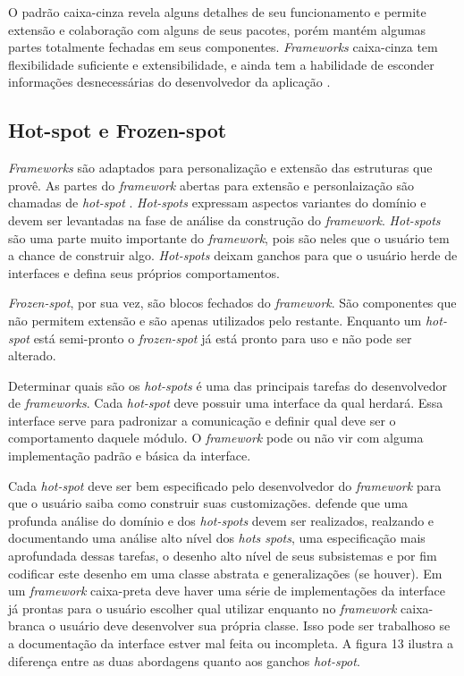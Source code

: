 O padrão caixa-cinza revela alguns detalhes de seu funcionamento e permite extensão e colaboração com alguns de seus pacotes, porém mantém algumas partes totalmente fechadas em seus componentes. \textit{Frameworks} caixa-cinza tem flexibilidade suficiente e extensibilidade, e ainda tem a habilidade de esconder informações desnecessárias do desenvolvedor da aplicação \cite{Fayad1999}.

\subsection{Hot-spot e Frozen-spot}

\textit{Frameworks} são adaptados para personalização e extensão das estruturas que provê. As partes do \textit{framework} abertas para extensão e personlaização são chamadas de \textit{hot-spot} \cite{Fayad1999}. \textit{Hot-spots} expressam aspectos variantes do domínio e devem ser levantadas na fase de análise da construção do \textit{framework}. \textit{Hot-spots} são uma parte muito importante do \textit{framework}, pois são neles que o usuário tem a chance de construir algo. \textit{Hot-spots} deixam ganchos para que o usuário herde de interfaces e defina seus próprios comportamentos.

\textit{Frozen-spot}, por sua vez, são blocos fechados do \textit{framework}. São componentes que não permitem extensão e são apenas utilizados pelo restante. Enquanto um \textit{hot-spot} está semi-pronto o \textit{frozen-spot} já está pronto para uso e não pode ser alterado.

Determinar quais são os \textit{hot-spots} é uma das principais tarefas do desenvolvedor de \textit{frameworks}. Cada \textit{hot-spot} deve possuir uma interface da qual herdará. Essa interface serve para padronizar a comunicação e definir qual deve ser o comportamento daquele módulo. O \textit{framework} pode ou não vir com alguma implementação padrão e básica da interface.

Cada \textit{hot-spot} deve ser bem especificado pelo desenvolvedor do \textit{framework} para que o usuário saiba como construir suas customizações. \cite{Fayad1999} defende que uma profunda análise do domínio e dos \textit{hot-spots} devem ser realizados, realzando e documentando uma análise alto nível dos \textit{hots spots}, uma especificação mais aprofundada dessas tarefas, o desenho alto nível de seus subsistemas e por fim codificar este desenho em uma classe abstrata e generalizações (se houver). Em um \textit{framework} caixa-preta deve haver uma série de implementações da interface já prontas para o usuário escolher qual utilizar enquanto no \textit{framework} caixa-branca o usuário deve desenvolver sua própria classe. Isso pode ser trabalhoso se a documentação da interface estver mal feita ou incompleta. A figura 13 ilustra a diferença entre as duas abordagens quanto aos ganchos \textit{hot-spot}.

